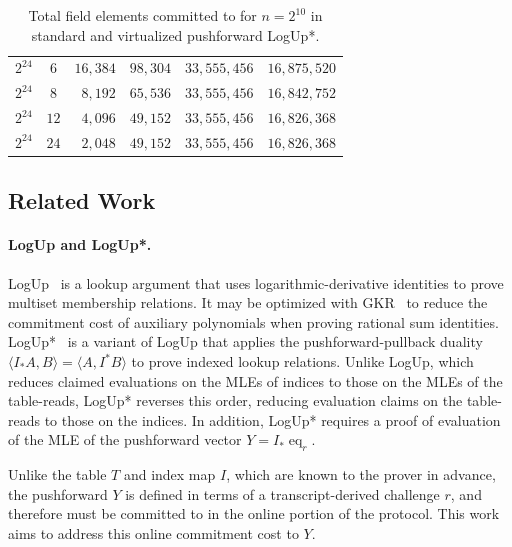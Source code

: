 \begin{table}[!htbp]
\begin{tabular}{c c r r r r}
    $2^{24}$ & $6$
    & $16{,}384$
    & $98{,}304$
    & $33{,}555{,}456$
    & $16{,}875{,}520$ \\
    
    $2^{24}$ & $8$
    & $8{,}192$
    & $65{,}536$
    & $33{,}555{,}456$
    & $16{,}842{,}752$ \\
    
    $2^{24}$ & $12$
    & $4{,}096$
    & $49{,}152$
    & $33{,}555{,}456$
    & $16{,}826{,}368$ \\
    
    $2^{24}$ & $24$
    & $2{,}048$
    & $49{,}152$
    & $33{,}555{,}456$
    & $16{,}826{,}368$ \\
    
    \hline
\end{tabular}
\caption{Total field elements committed to for $n=2^{10}$ in standard and virtualized pushforward LogUp*.}
\label{tab:commitment-sizes}
\end{table}
\FloatBarrier

\subsection{Related Work}

\paragraph{LogUp and LogUp*.}

LogUp~\cite{cryptoeprint:2022/1530} is a lookup argument that uses logarithmic-derivative 
identities to prove multiset membership relations. It may be optimized with GKR~\cite{cryptoeprint:2023/1284}
to reduce the commitment cost of auxiliary polynomials when proving rational sum identities. 
LogUp*~\cite{cryptoeprint:2025/946} is a variant of LogUp that applies the pushforward-pullback 
duality \(\langle I_{*}A, B\rangle = \langle A, I^{*}B\rangle\) to prove indexed 
lookup relations. Unlike LogUp, which reduces claimed evaluations on the MLEs of indices to those on the 
MLEs of the table-reads, LogUp* reverses this order, reducing evaluation claims on the table-reads to those 
on the indices. In addition, LogUp* requires a proof of evaluation of the MLE of the pushforward vector 
\(Y=I_*\operatorname{eq}_r\).

Unlike the table \(T\) and index map \(I\), which are known to the prover in advance, the pushforward \(Y\) is 
defined in terms of a transcript-derived challenge \(r\), and therefore must be committed to in the 
online portion of the protocol. This work aims to address this online commitment cost to \(Y\).

